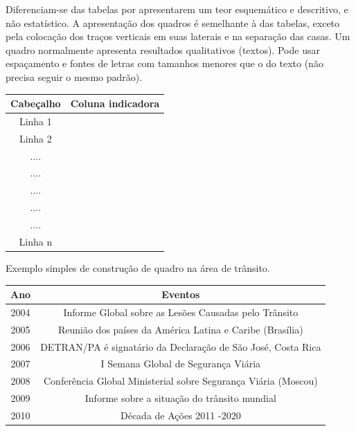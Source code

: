 Diferenciam-se das tabelas por apresentarem um teor esquemático e descritivo, e não estatístico. A apresentação dos quadros é semelhante à das tabelas, exceto pela colocação dos traços verticais em suas laterais e na separação das casas. Um quadro normalmente apresenta resultados qualitativos (textos). Pode usar espaçamento e fontes de letras com tamanhos menores que o do texto (não precisa seguir o mesmo padrão).   

\begin{quadro}[!htp]
    \centering
    \caption{Equema geral sobre a construção básica de um Quadro conforme as normas do IBGE de 1993}
    \begin{tabular}{|c|l|}
    \hline\hline
    \textbf{Cabeçalho}  & \textbf{Coluna indicadora}   \\    
    \hline\hline
     Linha 1      &              \\
     Linha 2      &              \\
      ....        &              \\
      ....        &              \\
      ....        &              \\
      ....        &              \\
      ....        &              \\
      Linha n     &              \\ 
  \hline\hline
   \end{tabular}
\end{quadro}

\newpage
Exemplo simples de construção de quadro na área de trânsito. 

\begin{quadro}[htp!]
    \centering
    \caption{Informe Global sobre a Segurança Viária, no período de 2004 a 2010.}
    \begin{tabular}{|c|c|}
    \hline\hline
    Ano    & Eventos  \\    
    \hline\hline
     2004  & Informe Global sobre as Lesões Causadas pelo Trânsito     \\
     2005  & Reunião dos países da América Latina e Caribe (Brasília)  \\
     2006  & DETRAN/PA é signatário da Declaração de São José, Costa Rica  \\
     2007  & I Semana Global de Segurança Viária \\
     2008  & Conferência Global Ministerial sobre Segurança Viária (Moscou) \\
     2009  & Informe sobre a situação do trânsito mundial \\
     2010  & Década de Ações 2011 -2020 \\
  \hline\hline
    \end{tabular}
\end{quadro}


